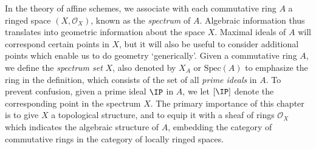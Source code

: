 %
%

In the theory of affine schemes, we associate with each commutative ring $A$ a ringed space $(X,\mathcal{O}_X)$, known as the \emph{spectrum} of $A$. Algebraic information thus translates into geometric information about the space $X$. Maximal ideals of $A$ will correspond certain points in $X$, but it will also be useful to consider additional points which enable us to do geometry `generically'. Given a commutative ring $A$, we define the \emph{spectrum set} $X$, also denoted by $X_A$ or $\text{Spec}(A)$ to emphasize the ring in the definition, which consists of the set of all \emph{prime ideals} in $A$. To prevent confusion, given a prime ideal $\IP$ in $A$, we let $[\IP]$ denote the corresponding point in the spectrum $X$.
The primary importance of this chapter is to give $X$ a topological structure, and to equip it with a sheaf of rings $\mathcal{O}_X$ which indicates the algebraic structure of $A$, embedding the category of commutative rings in the category of locally ringed spaces.


